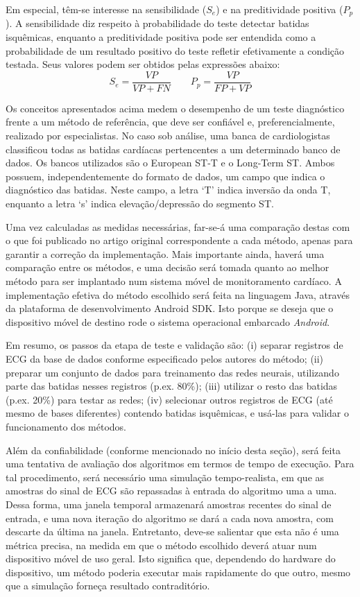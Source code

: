 Em especial, têm-se interesse na sensibilidade ($S_e$) e na preditividade positiva ($P_p$). A sensibilidade diz respeito à probabilidade do teste detectar batidas isquêmicas, enquanto a preditividade positiva pode ser entendida como a probabilidade de um resultado positivo do teste refletir efetivamente a condição testada. Seus valores podem ser obtidos pelas expressões abaixo:
\begin{equation} \label{equ:metrics}
    S_e = \frac{VP}{VP+FN}
    \quad\quad
    P_p = \frac{VP}{FP+VP}
\end{equation}

Os conceitos apresentados acima medem o desempenho de um teste diagnóstico frente a um método de referência, que deve ser confiável e, preferencialmente, realizado por especialistas. No caso sob análise, uma banca de cardiologistas classificou todas as batidas cardíacas pertencentes a um determinado banco de dados. Os bancos utilizados são o European ST-T e o Long-Term ST. Ambos possuem, independentemente do formato de dados, um campo que indica o diagnóstico das batidas. Neste campo, a letra `T' indica inversão da onda T, enquanto a letra `s' indica elevação/depressão do segmento ST.

Uma vez calculadas as medidas necessárias, far-se-á uma comparação destas com o que foi publicado no artigo original correspondente a cada método, apenas para garantir a correção da implementação. Mais importante ainda, haverá uma comparação entre os métodos, e uma decisão será tomada quanto ao melhor método para ser implantado num sistema móvel de monitoramento cardíaco. A implementação efetiva do método escolhido será feita na linguagem Java, através da plataforma de desenvolvimento Android SDK. Isto porque se deseja que o dispositivo móvel de destino rode o sistema operacional embarcado \emph{Android}.

Em resumo, os passos da etapa de teste e validação são: (i) separar registros de ECG da base de dados conforme especificado pelos autores do método; (ii) preparar um conjunto de dados para treinamento das redes neurais, utilizando parte das batidas nesses registros (p.ex. 80\%); (iii) utilizar o resto das batidas (p.ex. 20\%) para testar as redes; (iv) selecionar outros registros de ECG (até mesmo de bases diferentes) contendo batidas isquêmicas, e usá-las para validar o funcionamento dos métodos.

Além da confiabilidade (conforme mencionado no início desta seção), será feita uma tentativa de avaliação dos algoritmos em termos de tempo de execução. Para tal procedimento, será necessário uma simulação tempo-realista, em que as amostras do sinal de ECG são repassadas à entrada do algoritmo uma a uma. Dessa forma, uma janela temporal armazenará amostras recentes do sinal de entrada, e uma nova iteração do algoritmo se dará a cada nova amostra, com descarte da última na janela. Entretanto, deve-se salientar que esta não é uma métrica precisa, na medida em que o método escolhido deverá atuar num dispositivo móvel de uso geral. Isto significa que, dependendo  do hardware do dispositivo, um método poderia executar mais rapidamente do que outro, mesmo que a simulação forneça resultado contraditório.

